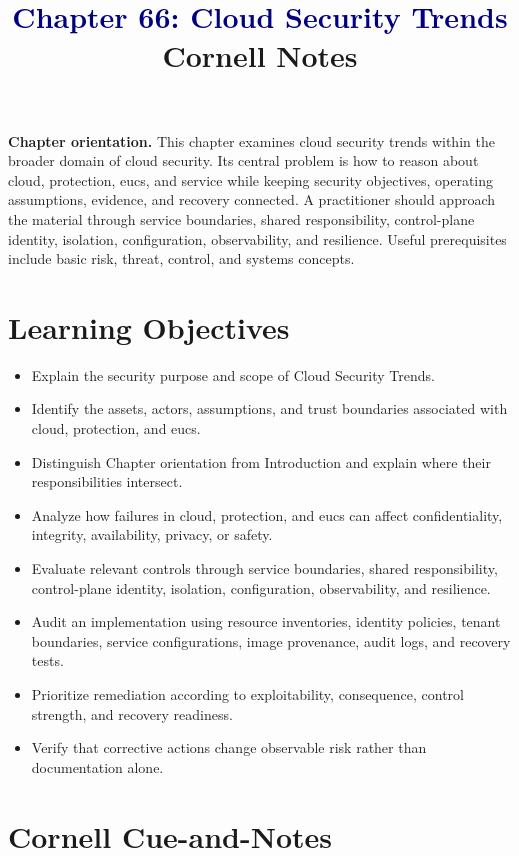 \documentclass[11pt]{article}
\title{\textcolor{Navy}{Chapter 66: Cloud Security Trends}\\[2mm]\large Cornell Notes}
\author{}
\date{}
\begin{document}
\maketitle
\thispagestyle{fancy}
\vspace{-1.5em}
\begin{orientationbox}
\textbf{Chapter orientation.} This chapter examines cloud security trends within the broader domain of cloud security. Its central problem is how to reason about cloud, protection, eucs, and service while keeping security objectives, operating assumptions, evidence, and recovery connected. A practitioner should approach the material through service boundaries, shared responsibility, control-plane identity, isolation, configuration, observability, and resilience. Useful prerequisites include basic risk, threat, control, and systems concepts.
\end{orientationbox}
\section*{Learning Objectives}
\begin{itemize}
\item Explain the security purpose and scope of Cloud Security Trends.
\item Identify the assets, actors, assumptions, and trust boundaries associated with cloud, protection, and eucs.
\item Distinguish Chapter orientation from Introduction and explain where their responsibilities intersect.
\item Analyze how failures in cloud, protection, and eucs can affect confidentiality, integrity, availability, privacy, or safety.
\item Evaluate relevant controls through service boundaries, shared responsibility, control-plane identity, isolation, configuration, observability, and resilience.
\item Audit an implementation using resource inventories, identity policies, tenant boundaries, service configurations, image provenance, audit logs, and recovery tests.
\item Prioritize remediation according to exploitability, consequence, control strength, and recovery readiness.
\item Verify that corrective actions change observable risk rather than documentation alone.
\end{itemize}
\section*{Cornell Cue-and-Notes}
\end{document}
